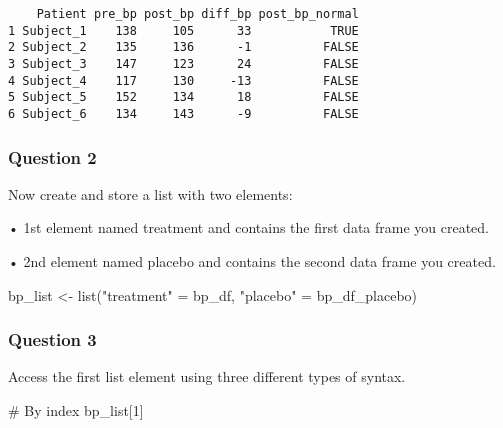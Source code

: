 \documentclass[
  letterpaper,
  DIV=11,
  numbers=noendperiod]{scrartcl}
\newenvironment{Shaded}{\begin{snugshade}}{\end{snugshade}}
\newcommand{\CommentTok}[1]{\textcolor[rgb]{0.37,0.37,0.37}{#1}}
\newcommand{\DecValTok}[1]{\textcolor[rgb]{0.68,0.00,0.00}{#1}}
\newcommand{\FunctionTok}[1]{\textcolor[rgb]{0.28,0.35,0.67}{#1}}
\newcommand{\NormalTok}[1]{\textcolor[rgb]{0.00,0.23,0.31}{#1}}
\newcommand{\OtherTok}[1]{\textcolor[rgb]{0.00,0.23,0.31}{#1}}
\newcommand{\StringTok}[1]{\textcolor[rgb]{0.13,0.47,0.30}{#1}}
\begin{document}
\begin{verbatim}
    Patient pre_bp post_bp diff_bp post_bp_normal
1 Subject_1    138     105      33           TRUE
2 Subject_2    135     136      -1          FALSE
3 Subject_3    147     123      24          FALSE
4 Subject_4    117     130     -13          FALSE
5 Subject_5    152     134      18          FALSE
6 Subject_6    134     143      -9          FALSE
\end{verbatim}

\subsubsection{Question 2}\label{question-2-2}

Now create and store a list with two elements:

• 1st element named treatment and contains the first data frame you
created.

• 2nd element named placebo and contains the second data frame you
created.

\begin{Shaded}
\begin{Highlighting}[]
\NormalTok{bp\_list }\OtherTok{\textless{}{-}} \FunctionTok{list}\NormalTok{(}\StringTok{"treatment"} \OtherTok{=}\NormalTok{ bp\_df, }
                \StringTok{"placebo"} \OtherTok{=}\NormalTok{ bp\_df\_placebo)}
\end{Highlighting}
\end{Shaded}

\subsubsection{Question 3}\label{question-3-2}

Access the first list element using three different types of syntax.

\begin{Shaded}
\begin{Highlighting}[]
\CommentTok{\# By index}
\NormalTok{bp\_list[}\DecValTok{1}\NormalTok{]}
\end{Highlighting}
\end{Shaded}
\end{document}
